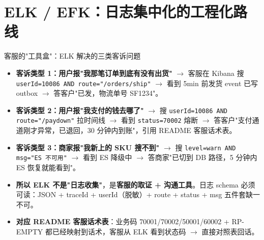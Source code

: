 \documentclass[aspectratio=169,11pt]{beamer}
\begin{document}
\section{ELK / EFK：日志集中化的工程化路线}

\begin{frame}[shrink]{客服的"工具盒"：ELK 解决的三类客诉问题}
\begin{itemize}
  \item \textbf{客诉类型 1：用户报"我那笔订单到底有没有出货"} $\to$ 客服在 Kibana 搜 \texttt{userId=10086 AND route="/orders/ship"} $\to$ 看到 5min 前发货 event 已写 outbox $\to$ 答客户"已发，物流单号 SF1234"。
  \item \textbf{客诉类型 2：用户报"我支付的钱去哪了"} $\to$ 搜 \texttt{userId=10086 AND route="/paydown"} 拉时间线 $\to$ 看到 \texttt{status=70002} 熔断 $\to$ 答客户"支付通道刚才异常，已退回，30 分钟内到账"，引用 README 客服话术表。
  \item \textbf{客诉类型 3：商家报"我新上的 SKU 搜不到"} $\to$ 搜 \texttt{level=warn AND msg="ES 不可用"} $\to$ 看到 ES 降级中 $\to$ 答商家"已切到 DB 路径，5 分钟内 ES 恢复就能看到"。
  \item \textbf{所以 ELK 不是"日志收集"}，是\textbf{客服的取证 + 沟通工具}。日志 schema 必须可读：JSON + traceId + userId（脱敏）+ route + status + msg 五件套缺一不可。
  \item \textbf{对应 README 客服话术表}：业务码 70001/70002/50001/60002 + RP-EMPTY 都已经映射到话术，客服从 ELK 看到状态码 $\to$ 直接对照表回话。
\end{itemize}
\end{frame}
\end{document}
